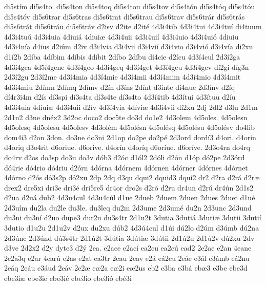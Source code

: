 {di5st^^edm
di5s4to.
di5s4ton
di5s4toq
di5s4tou
di5s4tov
di5s4t^^f3n
di5s4t^^f3q
di5s4t^^f3u
di5s4t^^f3v
di5s6trar
di5s6tras
di5s6trat
di5s6trau
di5s6trav
di5s6tr^^e1r
di5s6tr^^e1s
di5s6tr^^e1t
di5s6tr^^e1u
di5s6tr^^e1v
d2isv
d2ite
d2it^^e9
4d3i4tib
4d3i4tui
4d3i4tu^^ed
di4tuum
4d3i4tu^^fa
4d3i4uia
4diui^^e1
4diui^^e6
4d3i4uii
4d3i4ui^^ed
4d3i4uio
4d3i4ui^^f3
4diuiu
4d3i4u^^eda
d4ius
d2i^^fam
d2iv
d3i4via
d3i4vii
d3i4vi^^ed
d3i4vio
d3i4vi^^f3
d3i4v^^eda
di2xu
d1^^ed2b
2d^^edba
4d^^edbim
4d^^edbis
4d^^edbit
2d^^edbo
2d^^edbu
d^^ed4cie
d2^^edcu
4d3^^ed4cul
2d3^^ed2ga
4d3^^ed4gea
4d5^^ed4gene
4d3^^ed4geo
4d3^^ed4geq
4d3^^ed4get
4d3^^ed4geu
4d3^^ed4gev
d^^ed2gi
d^^edg3n
2d3^^ed2gu
2d3^^ed2me
4d3^^ed4mia
4d3^^ed4mie
4d3^^ed4mii
4d3^^ed4mim
4d3^^ed4mio
4d3^^ed4mit
4d3^^ed4miu
2d^^edmn
2d^^edmq
2d^^edmv
d2^^edn
d3^^edns
2d^^ednt
d3^^ednte
d^^ed4nue
2d3^^ednv
d2^^edq
d^^ed4r3i4m
d2^^eds
d^^ed3spi
d^^ed3s4ta
d^^ed3s4te
d^^ed3s4to
4d3^^ed4tib
4d3^^edtui
4d3^^edtuu
d2^^edu
4d3^^ed4uia
4d^^edui^^e6
4d3^^ed4uii
d2^^edv
4d3^^ed4via
4d^^edvi^^e6
4d3^^ed4vii
d^^ed2xu
2dj
2dl2
d3lu
2d1m
2d1n2
d3ne
dn^^e9x2
3d2oc
doco2
doc5te
do3d
do1e2
4d3olem
4d5oles.
4d5olesn
4d5olesq
4d5olesu
4d5olesv
4d3ol^^e9m
4d5ol^^e9sn
4d5ol^^e9sq
4d5ol^^e9su
4d5ol^^e9sv
do4lib
dom4i3
d2on
3don.
do3ne
do3ni
2d1op
do2pe
do2p^^e9
2d3ord
dord^^ed3
d4ori.
d4orin
d4oriq
d3o4rit
d6oriue.
d6orive.
d4or^^edn
d4or^^edq
d6or^^edue.
d6or^^edve.
2d3o4rn
do4rq
do4rv
d2os
do3sp
do3u
do3v
d^^f3b3
d2^^f3c
d1^^f3l2
2d^^f3li
d2^^f3n
d1^^f3p
d^^f32pe
2d3^^f3rd
d^^f34rie
d^^f34rio
d^^f34riu
d2^^f3rn
4d^^f3rna
4d^^f3rnem
4d^^f3rnen
4d^^f3rner
4d^^f3rnes
4d^^f3rnet
4d^^f3rno
d2^^f3s
d^^f33s2p
d^^f32xu
2dp
2dq
d3qu
dqui2
dquid3
dqu^^ed2
dr2
d2ra
d2r^^e1
d2r^^e6
drex2
dre5xi
dri3e
dri3^^e9
dri5re5
dr4or
dro2s
d2r^^f3
d2ru
dr4un
d2r^^fa
dr4^^fan
2d1s2
d2ua
d2u^^e1
dub2
4d3u4cul
4d3u4c^^fal
d1ue
2dueb
2duem
2duen
2dues
2duet
d1u^^e9
2d3u^^edm
du2la
du2le
du3le.
du3leq
du2m
2d3ume
2d3um^^e9
du2n
2d3unc
2d3und
du3ni
du3n^^ed
d2uo
dupe3
dur2u
du3s4tr
2d1u2t
3dutia
3duti^^e1
3duti^^e6
3dutii
3duti^^ed
3dutio
d1u2u
2d1u2v
d2ux
du2xu
d^^fab2
4d3^^fa4cul
d1^^fai
d^^fa2lo
d2^^fam
d3^^famb
d^^fa2na
2d3^^fanc
2d3^^fand
d^^fa3s4tr
2d1^^fa2t
3d^^fatia
3d^^fati^^e6
3d^^fatii
2d1^^fa2u
2d1^^fa2v
d^^fa2xu
2dv
d3ve
2d2x2
d2y
dyte3
d2^^fd
2ea.
e2ace
e2ac^^ed
ea2cu
ea2c^^fa
ead2
2e2ae
e2an
4eane
2e2a3q
e2ar
4ear^^fa
e2as
e2at
ea3tr
2eau
2eav
e2^^e1
e^^e12cu
2e^^e1e
e3^^e1l
e3^^e1mb
e^^e12nu
2e^^e1q
2e^^e1u
e3^^e1ud
2e^^e1v
2e2^^e6
e^^e62a
e^^e62i
e^^e62us
eb2
e3ba
e3b^^e1
eb^^e63
e3be
ebe3d
ebe3i^^e6
ebe3ie
ebe3i^^e9
ebe3io
ebe3i^^f3
eb^^e93i
}
